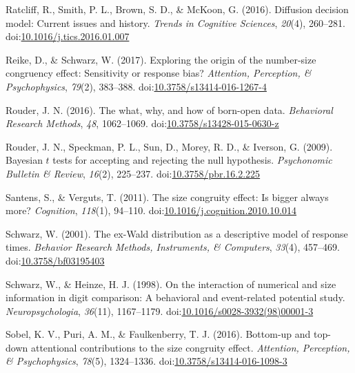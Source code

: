 \documentclass[english,,man]{apa6}
\theoremstyle{definition}
\theoremstyle{definition}
\theoremstyle{definition}
\theoremstyle{remark}
\begin{document}
\leavevmode\hypertarget{ref-ratcliff2016}{}%
Ratcliff, R., Smith, P. L., Brown, S. D., \& McKoon, G. (2016).
Diffusion decision model: Current issues and history. \emph{Trends in
Cognitive Sciences}, \emph{20}(4), 260--281.
doi:\href{https://doi.org/10.1016/j.tics.2016.01.007}{10.1016/j.tics.2016.01.007}

\leavevmode\hypertarget{ref-reike2017}{}%
Reike, D., \& Schwarz, W. (2017). Exploring the origin of the
number-size congruency effect: Sensitivity or response bias?
\emph{Attention, Perception, \& Psychophysics}, \emph{79}(2), 383--388.
doi:\href{https://doi.org/10.3758/s13414-016-1267-4}{10.3758/s13414-016-1267-4}

\leavevmode\hypertarget{ref-rouder2016}{}%
Rouder, J. N. (2016). The what, why, and how of born-open data.
\emph{Behavioral Research Methods}, \emph{48}, 1062--1069.
doi:\href{https://doi.org/10.3758/s13428-015-0630-z}{10.3758/s13428-015-0630-z}

\leavevmode\hypertarget{ref-rouder2009}{}%
Rouder, J. N., Speckman, P. L., Sun, D., Morey, R. D., \& Iverson, G.
(2009). Bayesian \(t\) tests for accepting and rejecting the null
hypothesis. \emph{Psychonomic Bulletin \& Review}, \emph{16}(2),
225--237.
doi:\href{https://doi.org/10.3758/pbr.16.2.225}{10.3758/pbr.16.2.225}

\leavevmode\hypertarget{ref-santens2011}{}%
Santens, S., \& Verguts, T. (2011). The size congruity effect: Is bigger
always more? \emph{Cognition}, \emph{118}(1), 94--110.
doi:\href{https://doi.org/10.1016/j.cognition.2010.10.014}{10.1016/j.cognition.2010.10.014}

\leavevmode\hypertarget{ref-schwarz2001}{}%
Schwarz, W. (2001). The ex-Wald distribution as a descriptive model of
response times. \emph{Behavior Research Methods, Instruments, \&
Computers}, \emph{33}(4), 457--469.
doi:\href{https://doi.org/10.3758/bf03195403}{10.3758/bf03195403}

\leavevmode\hypertarget{ref-schwarzHeinze1998}{}%
Schwarz, W., \& Heinze, H. J. (1998). On the interaction of numerical
and size information in digit comparison: A behavioral and event-related
potential study. \emph{Neuropsychologia}, \emph{36}(11), 1167--1179.
doi:\href{https://doi.org/10.1016/s0028-3932(98)00001-3}{10.1016/s0028-3932(98)00001-3}

\leavevmode\hypertarget{ref-sobel2016}{}%
Sobel, K. V., Puri, A. M., \& Faulkenberry, T. J. (2016). Bottom-up and
top-down attentional contributions to the size congruity effect.
\emph{Attention, Perception, \& Psychophysics}, \emph{78}(5),
1324--1336.
doi:\href{https://doi.org/10.3758/s13414-016-1098-3}{10.3758/s13414-016-1098-3}
\end{document}

